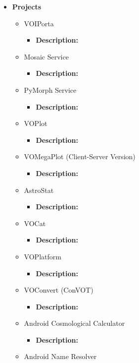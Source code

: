 \begin{itemize}
\item \textbf{Projects}
\begin{itemize}
\item VOIPorta
\begin{itemize}
\item \textbf{Description:}
\end{itemize}
\item Mosaic Service
\begin{itemize}
\item \textbf{Description:}
\end{itemize}
\item PyMorph Service
\begin{itemize}
\item \textbf{Description:}
\end{itemize}
\item VOPlot
\begin{itemize}
\item \textbf{Description:}
\end{itemize}
\item VOMegaPlot (Client-Server Version)
\begin{itemize}
\item \textbf{Description:}
\end{itemize}
\item AstroStat
\begin{itemize}
\item \textbf{Description:}
\end{itemize}
\item VOCat
\begin{itemize}
\item \textbf{Description:}
\end{itemize}
\item VOPlatform
\begin{itemize}
\item \textbf{Description:}
\end{itemize}
\item VOConvert (ConVOT)
\begin{itemize}
\item \textbf{Description:}
\end{itemize}
\item Android Cosmological Calculator
\begin{itemize}
\item \textbf{Description:}
\end{itemize}
\item Android Name Resolver

\end{itemize}
\end{itemize}
